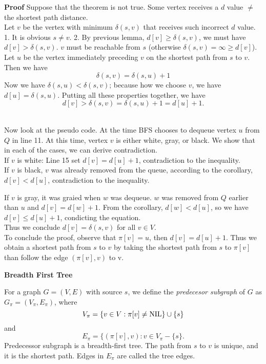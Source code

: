 \documentclass{beamer}
\begin{document}
\begin{frame}{}

{\bf Proof} Suppose that the theorem is not true.  Some vertex receives
a $d$ value $\ne$ the shortest path distance.  \\
Let $v$ be the vertex with minimum $\delta(s,v)$ that receives such
incorrect $d$ value.  \\
1. It is obvious $s\ne v$.  2. By previous lemma, $d[v]\ge \delta(s,v)$, 
 we must have $d[v]>\delta(s,v)$. $v$ must be reachable from $s$ (otherwise
$\delta(s,v)=\infty\ge d[v]$). \\
Let $u$ be the vertex immediately preceding $v$ on the shortest path from 
 $s$ to $v$.  Then we have $$\delta(s,v)=\delta(s,u)+1$$
Now we have $\delta(s,u)<\delta(s,v)$; because how we choose $v$, we have
 $d[u]=\delta(s,u)$. Putting all these properties together, we have
$$d[v]>\delta(s,v)=\delta(s,u)+1=d[u]+1.$$ \\
\end{frame}

\begin{frame}{}

Now look at the pseudo code.  At the time BFS chooses to dequeue vertex $u$
 from $Q$ in line 11.  At this time, vertex $v$ is either white, gray, or
 black.  We show that in each of the cases, we can derive contradiction.  \\
If $v$ is white: Line 15 set $d[v]=d[u]+1$, contradiction to the inequality.\\
If $v$ is black, $v$ was already removed from the queue, according to the 
corollary, $d[v]<d[u]$, contradiction to the inequality. \\
\end{frame}

\begin{frame}{}

If $v$ is gray, it was graied when $w$ was dequeue.  $w$ was removed from 
$Q$ earlier than $u$ and $d[v]=d[w]+1$.  From the corollary, $d[w]<d[u]$,
so we have $d[v]\le d[u]+1$, condicting the equation.  \\
Thus we conclude $d[v]=\delta(s,v)$ for all $v\in V$.  \\
To conclude the proof, observe that $\pi[v]=u$, then $d[v]=d[u]+1$.
Thus we obtain a shortest path from $s$ to $v$ by taking the shortest path
from $s$ to $\pi[v]$ than follow the edge $(\pi[v],v)$ to v.  
\end{frame}

\begin{frame}{}

\centerline{\bf Breadth First Tree}
For a graph $G=(V,E)$ with source $s$, we define the {\it predecesor subgraph}
of $G$ as $G_{\pi}=(V_{\pi},E_{\pi})$, where 
$$V_{\pi}=\{v\in V:\pi[v]\ne {\rm NIL}\} \cup \{s\}$$
and
$$E_{\pi}=\{(\pi[v],v):v\in V_{\pi}-\{s\}.$$
Predecessor subgraph is a breadth-first tree.  The path from $s$ to $v$
is unique, and it is the shortest path.  Edges in $E_\pi$ are called the
tree edges.  
\end{frame}
\end{document}
